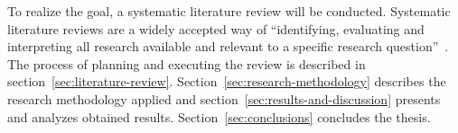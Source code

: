 To realize the goal, a systematic literature review will be conducted.
Systematic literature reviews are a widely accepted way of \enquote{identifying, evaluating and interpreting all research available and relevant to a specific research question}~\cite{kitchenham_guidelines_2007}.
The process of planning and executing the review is described in section~\ref{sec:literature-review}.
Section~\ref{sec:research-methodology} describes the research methodology applied and section~\ref{sec:results-and-discussion} presents and analyzes obtained results.
Section~\ref{sec:conclusions} concludes the thesis.
